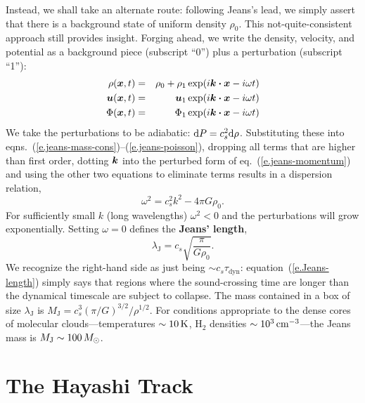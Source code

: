 Instead, we shall take an alternate route: following Jeans's lead, we simply assert that there is a background state of uniform density $\rho_{0}$. This not-quite-consistent approach still provides insight.
Forging ahead, we write the density, velocity, and potential as a background piece (subscript ``0'') plus a perturbation (subscript ``1''):
\begin{eqnarray*}
\rho(\boldsymbol{x},t) &=& \rho_{0} + \rho_{1}\exp(i\boldsymbol{k}\boldsymbol{\cdot}\boldsymbol{x} - i\omega t)\\
\boldsymbol{u}(\boldsymbol{x},t) &=& \boldsymbol{u}_{1}\exp(i\boldsymbol{k}\boldsymbol{\cdot}\boldsymbol{x} - i\omega t)\\
\Phi(\boldsymbol{x},t) &=& \Phi_{1}\exp(i\boldsymbol{k}\boldsymbol{\cdot}\boldsymbol{x} - i\omega t)
\end{eqnarray*}
We take the perturbations to be adiabatic: $\mathrm{d} P = c_{s}^{2}\mathrm{d}\rho$. Substituting these into eqns.~(\ref{e.jeans-mass-cons})--(\ref{e.jeans-poisson}), dropping all terms that are higher than first order, dotting $\boldsymbol{k}$ into the perturbed form of eq.~(\ref{e.jeans-momentum}) and using the other two equations to eliminate terms results in a dispersion relation,
\begin{equation}\label{e.jeans-dispersion}
\omega^{2} = c_{s}^{2}k^{2} - 4\pi G\rho_{0}.
\end{equation}
For sufficiently small $k$ (long wavelengths) $\omega^{2}<0$ and the perturbations will grow exponentially. Setting $\omega = 0$ defines the \textbf{Jeans' length},
\begin{equation}\label{e.Jeans-length}
\lambda_{\mathrm{J}} = c_{s}\sqrt{\frac{\pi}{G\rho_{0}}}.
\end{equation}
We recognize the right-hand side as just being $\sim c_{s} \tau_{\mathrm{dyn}}$: equation~(\ref{e.Jeans-length}) simply says that regions where the sound-crossing time are longer than the dynamical timescale are subject to collapse.  The mass contained in a box of size $\lambda_{\mathrm{J}}$ is $M_{\mathrm{J}} = c_{s}^{3}(\pi/G)^{3/2}/\rho^{1/2}$.  For conditions appropriate to the dense cores of molecular clouds---temperatures $\sim 10\,\mathrm{K}$, $\mathrm{H}_{2}$ densities $\sim 10^{3}\,\mathrm{c}\mathrm{m}^{-3}$---the Jeans mass is $M_{\mathrm{J}} \sim 100\,M_\odot$.

\section{The Hayashi Track}\label{s.Hayashi}

